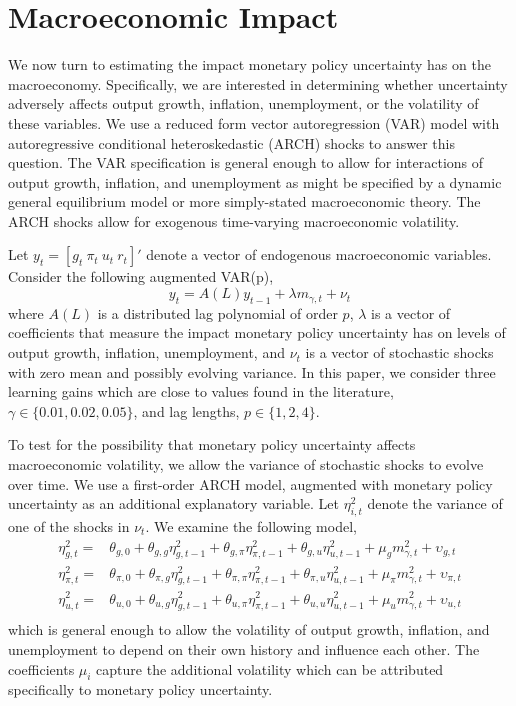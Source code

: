 \documentclass[12pt]{article}
\newcommand{\beq}{\begin{equation}}
\newcommand{\eeq}{\end{equation}}
\begin{document}
\section{Macroeconomic Impact}
We now turn to estimating the impact monetary policy uncertainty has on the macroeconomy.  Specifically, we are interested in determining whether uncertainty adversely affects output growth, inflation, unemployment, or the volatility of these variables.  We use a reduced form vector autoregression (VAR) model with autoregressive conditional heteroskedastic (ARCH) shocks to answer this question.  The VAR specification is general enough to allow for interactions of output growth, inflation, and unemployment as might be specified by a dynamic general equilibrium model or more simply-stated macroeconomic theory.  The ARCH shocks allow for exogenous time-varying macroeconomic volatility.  

Let $y_t = [g_t~ \pi_t~ u_t~ r_t]'$ denote a vector of endogenous macroeconomic variables. Consider the following augmented VAR(p),
\beq \label{eq:var} y_t = A(L) y_{t-1} + \lambda m_{\gamma,t} + \nu_{t} \eeq
where $A(L)$ is a distributed lag polynomial of order $p$, $\lambda$ is a vector of coefficients that measure the impact monetary policy uncertainty has on levels of output growth, inflation, unemployment, and $\nu_t$ is a vector of stochastic shocks with zero mean and possibly evolving variance.  In this paper, we consider three learning gains which are close to values found in the literature, $\gamma \in \{0.01, 0.02, 0.05\}$, and lag lengths, $p\in\{1,2,4\}$.

To test for the possibility that monetary policy uncertainty affects macroeconomic volatility, we allow the variance of stochastic shocks to evolve over time.  We use a first-order ARCH model, augmented with monetary policy uncertainty as an additional explanatory variable.  Let $\eta_{i,t}^2$ denote the variance of one of the shocks in $\nu_t$.  We examine the following model,
\beq \label{eq:arch}  \begin{array}{cc}
\eta_{g,t}^2 = & \theta_{g,0} + \theta_{g,g} \eta_{g,t-1}^2 + \theta_{g,\pi} \eta_{\pi,t-1}^2  + \theta_{g,u} \eta_{u,t-1}^2 + \mu_g m_{\gamma,t}^2 + \upsilon_{g,t} \\ [0.5pc]
\eta_{\pi,t}^2 = & \theta_{\pi,0} + \theta_{\pi,g} \eta_{g,t-1}^2 + \theta_{\pi,\pi} \eta_{\pi,t-1}^2 + \theta_{\pi,u} \eta_{u,t-1}^2  + \mu_\pi m_{\gamma,t}^2 + \upsilon_{\pi,t} \\ [0.5pc]
\eta_{u,t}^2 = & \theta_{u,0} + \theta_{u,g} \eta_{g,t-1}^2 + \theta_{u,\pi} \eta_{\pi,t-1}^2 + \theta_{u,u} \eta_{u,t-1}^2  + \mu_u m_{\gamma,t}^2 + \upsilon_{u,t} \\ 
\end{array}
\eeq
which is general enough to allow the volatility of output growth, inflation, and unemployment to depend on their own history and influence each other.  The coefficients $\mu_i$ capture the additional volatility which can be attributed specifically to monetary policy uncertainty.
\end{document}
